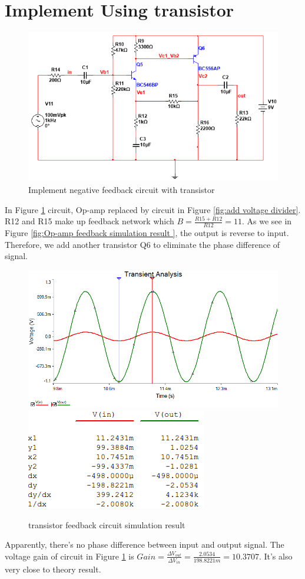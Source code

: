 \section{Implement Using transistor}


\begin{figure}[htbp]
\centering
\includegraphics[scale=0.7]{"../Photo/Chap2/transistor feedback"}
\caption{Implement negative feedback circuit with transistor}
\label{fig:transistorfeedback}
\end{figure}

In Figure \ref{fig:transistorfeedback} circuit, Op-amp replaced by circuit in Figure \ref{fig:add voltage divider}. R12 and R15 make up feedback network which $ B = \frac{R15+R12}{R12} = 11 $. As we see in Figure \ref{fig:Op-amp  feedback simulation result }, the output is reverse to input. Therefore, we add another transistor Q6 to eliminate the phase difference of signal.


\begin{figure}[htbp]
\centering
\includegraphics[scale=0.6]{"../Photo/Chap2/transistor feedback simulation wave"}\\[0.5cm]
\includegraphics[scale=1]{"../Photo/Chap2/transistor feedback simulation cursor data"}
\caption{transistor feedback circuit simulation result}
\label{fig:transistorfeedbacksimulationwave}
\end{figure}

Apparently, there's no phase difference between input and output signal. 
The voltage gain of circuit in Figure \ref{fig:transistorfeedback} is $ Gain = \frac{\Delta V_{out}}{\Delta V_{in}} = \frac{2.0534}{198.8221m} = 10.3707$. It's also very close to theory result.
 
 
